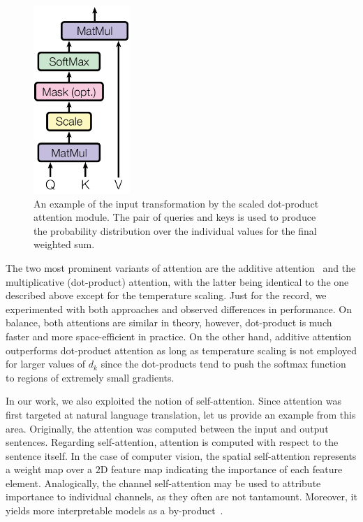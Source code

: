 \begin{figure}[!t]
  \centerline{\includegraphics[width=0.15\linewidth]{figures/siamese_tracking/scaled_dot_product_attention.pdf}}
  \caption[Scaled dot-product attention]{An example of the input transformation by the scaled dot-product attention module. The pair of queries and keys is used to produce the probability distribution over the individual values for the final weighted sum. }
  \label{fig:ScaledDotProductAttention}
\end{figure}

The two most prominent variants of attention are the additive attention~\cite{bahdanau2016additiveattention} and the multiplicative (dot-product) attention, with the latter being identical to the one described above except for the temperature scaling. Just for the record, we experimented with both approaches and observed differences in performance. On balance, both attentions are similar in theory, however, dot-product is much faster and more space-efficient in practice. On the other hand, additive attention outperforms dot-product attention as long as temperature scaling is not employed for larger values of $d_k$ since the dot-products tend to push the softmax function to regions of extremely small gradients.

In our work, we also exploited the notion of self-attention. Since attention was first targeted at natural language translation, let us provide an example from this area. Originally, the attention was computed between the input and output sentences. Regarding self-attention, attention is computed with respect to the sentence itself. In the case of computer vision, the spatial self-attention represents a weight map over a $2$D feature map indicating the importance of each feature element. Analogically, the channel self-attention may be used to attribute importance to individual channels, as they often are not tantamount. Moreover, it yields more interpretable models as a by-product~\cite{vaswani2017attention}.

